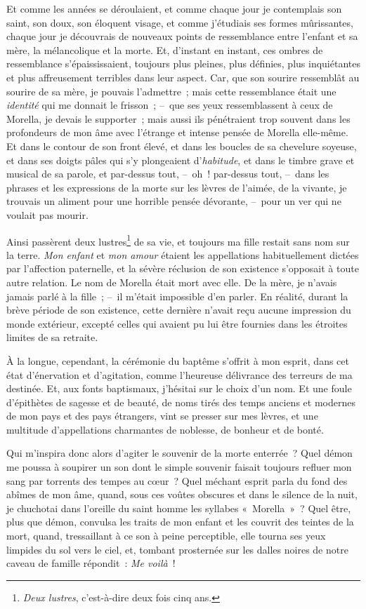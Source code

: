 \documentclass[french,twoside]{book} %
\begin{document}
Et comme les années se déroulaient, et comme chaque jour je contemplais son saint, son doux, son éloquent visage, et comme j’étudiais ses formes mûrissantes, chaque jour je découvrais de nouveaux points de ressemblance entre l’enfant et sa mère, la mélancolique et la morte. Et, d’instant en instant, ces ombres de ressemblance s’épaississaient, toujours plus pleines, plus définies, plus inquiétantes et plus affreusement terribles dans leur aspect. Car, que son sourire ressemblât au sourire de sa mère, je pouvais l’admettre ; mais cette ressemblance était une \emph{identité} qui me donnait le frisson ; – que ses yeux ressemblassent à ceux de Morella, je devais le supporter ; mais aussi ils pénétraient trop souvent dans les profondeurs de mon âme avec l’étrange et intense pensée de Morella elle-même. Et dans le contour de son front élevé, et dans les boucles de sa chevelure soyeuse, et dans ses doigts pâles qui s’y plongeaient d’\emph{habitude}, et dans le timbre grave et musical de sa parole, et par-dessus tout, – oh ! par-dessus tout, – dans les phrases et les expressions de la morte sur les lèvres de l’aimée, de la vivante, je trouvais un aliment pour une horrible pensée dévorante, – pour un ver qui ne voulait pas mourir.\par
Ainsi passèrent deux lustres\footnote{\emph{Deux lustres}, c’est-à-dire deux fois cinq ans.} de sa vie, et toujours ma fille restait sans nom sur la terre. \emph{Mon enfant} et \emph{mon amour} étaient les appellations habituellement dictées par l’affection paternelle, et la sévère réclusion de son existence s’opposait à toute autre relation. Le nom de Morella était mort avec elle. De la mère, je n’avais jamais parlé à la fille ; – il m’était impossible d’en parler. En réalité, durant la brève période de son existence, cette dernière n’avait reçu aucune impression du monde extérieur, excepté celles qui avaient pu lui être fournies dans les étroites limites de sa retraite.\par
À la longue, cependant, la cérémonie du baptême s’offrit à mon esprit, dans cet état d’énervation et d’agitation, comme l’heureuse délivrance des terreurs de ma destinée. Et, aux fonts baptismaux, j’hésitai sur le choix d’un nom. Et une foule d’épithètes de sagesse et de beauté, de noms tirés des temps anciens et modernes de mon pays et des pays étrangers, vint se presser sur mes lèvres, et une multitude d’appellations charmantes de noblesse, de bonheur et de bonté.\par
Qui m’inspira donc alors d’agiter le souvenir de la morte enterrée ? Quel démon me poussa à soupirer un son dont le simple souvenir faisait toujours refluer mon sang par torrents des tempes au cœur ? Quel méchant esprit parla du fond des abîmes de mon âme, quand, sous ces voûtes obscures et dans le silence de la nuit, je chuchotai dans l’oreille du saint homme les syllabes « Morella » ? Quel être, plus que démon, convulsa les traits de mon enfant et les couvrit des teintes de la mort, quand, tressaillant à ce son à peine perceptible, elle tourna ses yeux limpides du sol vers le ciel, et, tombant prosternée sur les dalles noires de notre caveau de famille répondit : \emph{Me voilà} !\par
\end{document}
